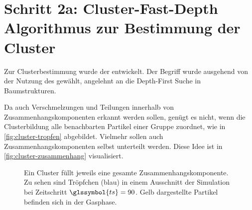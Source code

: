 \section{Schritt 2a: Cluster-Fast-Depth Algorithmus zur Bestimmung der Cluster}\label{sec:fast-depth}

Zur Clusterbestimmung wurde der \CFD entwickelt. Der Begriff wurde ausgehend von der Nutzung des  gewählt, angelehnt an die Depth-First Suche in Baumstrukturen.

Da auch Verschmelzungen und Teilungen innerhalb von Zusammenhangskomponenten erkannt werden sollen, genügt es nicht, wenn die Clusterbildung alle benachbarten Partikel einer Gruppe zuordnet, wie in \autoref{fig:cluster-tropfen} abgebildet. Vielmehr sollen auch Zusammenhangskomponenten selbst unterteilt werden. Diese Idee ist in \autoref{fig:cluster-zusammenhang} visualisiert.

\begin{figure}
	{\caption{Ein Cluster füllt jeweils eine gesamte Zusammenhangskomponente. Zu sehen sind Tröpfchen (blau) in einem Ausschnitt der Simulation bei Zeitschritt $\glssymbol{ts} = 90$. Gelb dargestellte Partikel befinden sich in der Gasphase.}\label{fig:cluster-tropfen}}
\end{figure}

